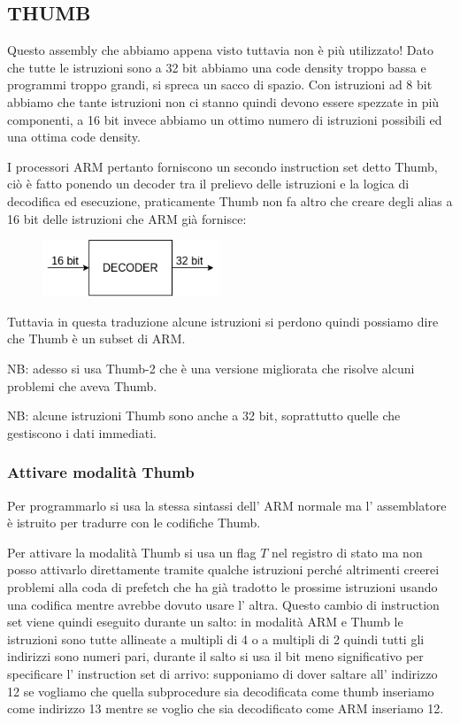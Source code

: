 {\subsection{THUMB}
Questo assembly che abbiamo appena visto tuttavia non è più utilizzato!
Dato che tutte le istruzioni sono a 32 bit abbiamo una code density troppo bassa e programmi troppo grandi, si spreca un sacco di spazio.
Con istruzioni ad 8 bit abbiamo che tante istruzioni non ci stanno quindi devono essere spezzate in più componenti, a 16 bit invece abbiamo un ottimo numero di istruzioni possibili ed una ottima code density.

I processori ARM pertanto forniscono un secondo instruction set detto Thumb, ciò è fatto ponendo un decoder tra il prelievo delle istruzioni e la logica di decodifica ed esecuzione, praticamente Thumb non fa altro che creare degli alias a 16 bit delle istruzioni che ARM già fornisce:
\begin{figure}[H]
    \centering
    \includegraphics[width=200px]{images/31_ARM/thumb_decoder.png}
\end{figure}
Tuttavia in questa traduzione alcune istruzioni si perdono quindi possiamo dire che Thumb è un subset di ARM.

NB: adesso si usa Thumb-2 che è una versione migliorata che risolve alcuni problemi che aveva Thumb.

NB: alcune istruzioni Thumb sono anche a 32 bit, soprattutto quelle che gestiscono i dati immediati.

\subsubsection{Attivare modalità Thumb}
Per programmarlo si usa la stessa sintassi dell' ARM normale ma l' assemblatore è istruito per tradurre con le codifiche Thumb.

Per attivare la modalità Thumb si usa un flag $T$ nel registro di stato ma non posso attivarlo direttamente tramite qualche istruzioni perché altrimenti creerei problemi alla coda di prefetch che ha già tradotto le prossime istruzioni usando una codifica mentre avrebbe dovuto usare l' altra.
Questo cambio di instruction set viene quindi eseguito durante un salto: in modalità ARM e Thumb le istruzioni sono tutte allineate a multipli di 4 o a multipli di 2 quindi tutti gli indirizzi sono numeri pari, durante il salto si usa il bit meno significativo per specificare l' instruction set di arrivo: supponiamo di dover saltare all' indirizzo 12 se vogliamo che quella subprocedure sia decodificata come thumb inseriamo come indirizzo 13 mentre se voglio che sia decodificato come ARM inseriamo 12.

}
